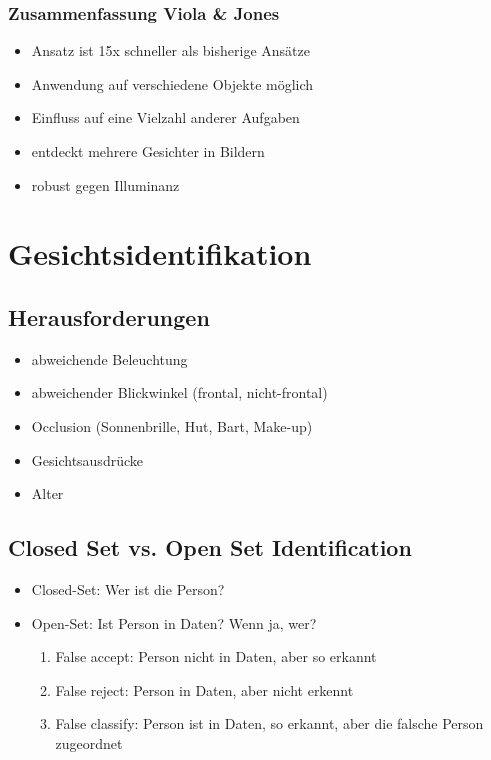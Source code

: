 \documentclass[paper=a4, fontsize=11pt]{scrartcl} %
\numberwithin{equation}{section} %
\numberwithin{figure}{section} %
\numberwithin{table}{section} %
\begin{document}
\subsubsection{Zusammenfassung Viola \& Jones}

\begin{itemize}
\item Ansatz ist 15x schneller als bisherige Ansätze
\item Anwendung auf verschiedene Objekte möglich
\item Einfluss auf eine Vielzahl anderer Aufgaben
\item entdeckt mehrere Gesichter in Bildern
\item robust gegen Illuminanz
\end{itemize}

\section{Gesichtsidentifikation}

\subsection{Herausforderungen}

\begin{itemize}
\item abweichende Beleuchtung
\item abweichender Blickwinkel (frontal, nicht-frontal)
\item Occlusion (Sonnenbrille, Hut, Bart, Make-up)
\item Gesichtsausdrücke
\item Alter
\end{itemize}

\subsection{Closed Set vs. Open Set Identification}

\begin{itemize}
\item Closed-Set: Wer ist die Person?
\item Open-Set: Ist Person in Daten? Wenn ja, wer?
\begin{enumerate}
\item False accept: Person nicht in Daten, aber so erkannt
\item False reject: Person in Daten, aber nicht erkennt
\item False classify: Person ist in Daten, so erkannt, aber die falsche Person zugeordnet
\end{enumerate}
\end{itemize}
\end{document}
